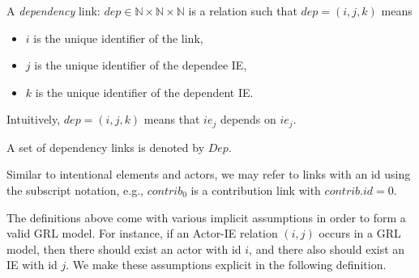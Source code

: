 \begin{definition}
\label{def:link:dependency}
A \emph{dependency} link: $dep\in \mathbb{N}\times\mathbb{N}\times\mathbb{N}$ is a relation such that $dep = (i,j,k)$ means
\begin{itemize}
\item $i$ is the unique identifier of the link,
\item $j$ is the unique identifier of the dependee IE,
\item $k$ is the unique identifier of the dependent IE.
\end{itemize}
Intuitively, $dep = (i,j,k)$ means that $ie_j$ depends on $ie_j$. 

A set of dependency links is denoted by $Dep$.
\end{definition}

Similar to intentional elements and actors, we may refer to links with an id using the subscript notation, e.g., $contrib_0$ is a contribution link with $contrib.id = 0$.

The definitions above come with various implicit assumptions in order to form a valid GRL model. For instance, if an Actor-IE relation $(i,j)$ occurs in a GRL model, then there should exist an actor with id $i$, and there also should exist an IE with id $j$. We make these assumptions explicit in the following definition.

